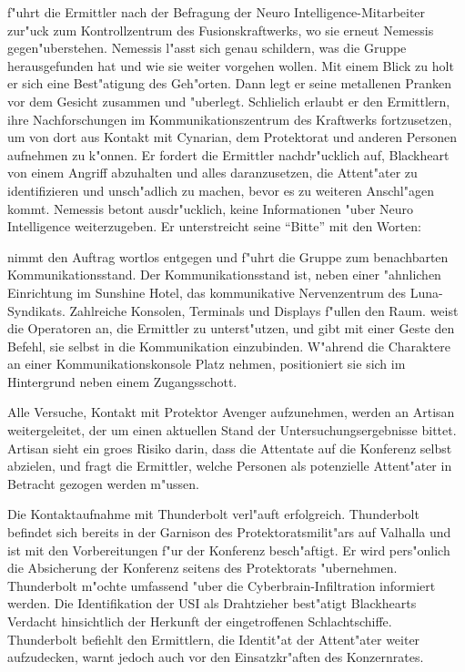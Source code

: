 \xl{} f"uhrt die Ermittler nach der Befragung der Neuro Intelligence-Mitarbeiter zur"uck zum Kontrollzentrum des Fusionskraftwerks, wo sie erneut Nemessis gegen"uberstehen. Nemessis l"asst sich genau schildern, was die Gruppe herausgefunden hat und wie sie weiter vorgehen wollen. Mit einem Blick zu \xl{} holt er sich eine Best"atigung des Geh"orten. Dann legt er seine metallenen Pranken vor dem Gesicht zusammen und "uberlegt. Schlie\3lich erlaubt er den Ermittlern, ihre Nachforschungen im Kommunikationszentrum des Kraftwerks fortzusetzen, um von dort aus Kontakt mit Cynarian, dem Protektorat und anderen Personen aufnehmen zu k"onnen. Er fordert die Ermittler nachdr"ucklich auf, Blackheart von einem Angriff abzuhalten und alles daranzusetzen, die Attent"ater zu identifizieren und unsch"adlich zu machen, bevor es zu weiteren Anschl"agen kommt. Nemessis betont ausdr"ucklich, keine Informationen "uber Neuro Intelligence weiterzugeben. Er unterstreicht seine ``Bitte'' mit den Worten:


\xl{} nimmt den Auftrag wortlos entgegen und f"uhrt die Gruppe zum benachbarten Kommunikationsstand. Der Kommunikationsstand ist, neben einer "ahnlichen Einrichtung im Sunshine Hotel, das kommunikative Nervenzentrum des Luna-Syndikats. Zahlreiche Konsolen, Terminals und Displays f"ullen den Raum. \xl{} weist die Operatoren an, die Ermittler zu unterst"utzen, und gibt mit einer Geste den Befehl, sie selbst in die Kommunikation einzubinden. W"ahrend die Charaktere an einer Kommunikationskonsole Platz nehmen, positioniert sie sich im Hintergrund neben einem Zugangsschott.

Alle Versuche, Kontakt mit Protektor Avenger aufzunehmen, werden an Artisan weitergeleitet, der um einen aktuellen Stand der Untersuchungsergebnisse bittet. Artisan sieht ein gro\3es Risiko darin, dass die Attentate auf die Konferenz selbst abzielen, und fragt die Ermittler, welche Personen als potenzielle Attent"ater in Betracht gezogen werden m"ussen.

Die Kontaktaufnahme mit Thunderbolt verl"auft erfolgreich. Thunderbolt befindet sich bereits in der Garnison des Protektoratsmilit"ars auf Valhalla und ist mit den Vorbereitungen f"ur der Konferenz besch"aftigt. Er wird pers"onlich die Absicherung der Konferenz seitens des Protektorats "ubernehmen. Thunderbolt m"ochte umfassend "uber die Cyberbrain-Infiltration informiert werden. Die Identifikation der USI als Drahtzieher best"atigt Blackhearts Verdacht hinsichtlich der Herkunft der eingetroffenen Schlachtschiffe. Thunderbolt befiehlt den Ermittlern, die Identit"at der Attent"ater weiter aufzudecken, warnt jedoch auch vor den Einsatzkr"aften des Konzernrates. 

